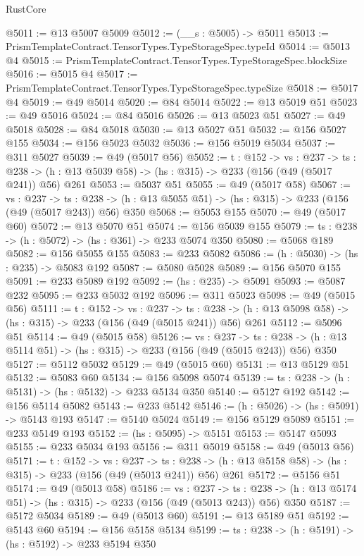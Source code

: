 \begin{lexlean}{RustCore}
\begin{coremodule}
@5011 := @13 @5007 @5009
@5012 := (__s : @5005) -> @5011
@5013 := PrismTemplateContract.TensorTypes.TypeStorageSpec.typeId
@5014 := @5013 @4
@5015 := PrismTemplateContract.TensorTypes.TypeStorageSpec.blockSize
@5016 := @5015 @4
@5017 := PrismTemplateContract.TensorTypes.TypeStorageSpec.typeSize
@5018 := @5017 @4
@5019 := @49 @5014
@5020 := @84 @5014
@5022 := @13 @5019 @51
@5023 := @49 @5016
@5024 := @84 @5016
@5026 := @13 @5023 @51
@5027 := @49 @5018
@5028 := @84 @5018
@5030 := @13 @5027 @51
@5032 := @156 @5027 @155
@5034 := @156 @5023 @5032
@5036 := @156 @5019 @5034
@5037 := @311 @5027
@5039 := @49 (@5017 @56)
@5052 := {t : @152} ->
  {vs : @237} ->
  {ts : @238} -> (h : @13 @5039 @58) -> (hs : @315) -> @233 (@156 (@49 (@5017 @241)) @56) @261
@5053 := @5037 @51
@5055 := @49 (@5017 @58)
@5067 := {vs : @237} ->
  {ts : @238} -> (h : @13 @5055 @51) -> (hs : @315) -> @233 (@156 (@49 (@5017 @243)) @56) @350
@5068 := @5053 @155
@5070 := @49 (@5017 @60)
@5072 := @13 @5070 @51
@5074 := @156 @5039 @155
@5079 := {ts : @238} -> (h : @5072) -> (hs : @361) -> @233 @5074 @350
@5080 := @5068 @189
@5082 := @156 @5055 @155
@5083 := @233 @5082
@5086 := (h : @5030) -> (hs : @235) -> @5083 @192
@5087 := @5080 @5028
@5089 := @156 @5070 @155
@5091 := @233 @5089 @192
@5092 := (hs : @235) -> @5091
@5093 := @5087 @232
@5095 := @233 @5032 @192
@5096 := @311 @5023
@5098 := @49 (@5015 @56)
@5111 := {t : @152} ->
  {vs : @237} ->
  {ts : @238} -> (h : @13 @5098 @58) -> (hs : @315) -> @233 (@156 (@49 (@5015 @241)) @56) @261
@5112 := @5096 @51
@5114 := @49 (@5015 @58)
@5126 := {vs : @237} ->
  {ts : @238} -> (h : @13 @5114 @51) -> (hs : @315) -> @233 (@156 (@49 (@5015 @243)) @56) @350
@5127 := @5112 @5032
@5129 := @49 (@5015 @60)
@5131 := @13 @5129 @51
@5132 := @5083 @60
@5134 := @156 @5098 @5074
@5139 := {ts : @238} -> (h : @5131) -> (hs : @5132) -> @233 @5134 @350
@5140 := @5127 @192
@5142 := @156 @5114 @5082
@5143 := @233 @5142
@5146 := (h : @5026) -> (hs : @5091) -> @5143 @193
@5147 := @5140 @5024
@5149 := @156 @5129 @5089
@5151 := @233 @5149 @193
@5152 := (hs : @5095) -> @5151
@5153 := @5147 @5093
@5155 := @233 @5034 @193
@5156 := @311 @5019
@5158 := @49 (@5013 @56)
@5171 := {t : @152} ->
  {vs : @237} ->
  {ts : @238} -> (h : @13 @5158 @58) -> (hs : @315) -> @233 (@156 (@49 (@5013 @241)) @56) @261
@5172 := @5156 @51
@5174 := @49 (@5013 @58)
@5186 := {vs : @237} ->
  {ts : @238} -> (h : @13 @5174 @51) -> (hs : @315) -> @233 (@156 (@49 (@5013 @243)) @56) @350
@5187 := @5172 @5034
@5189 := @49 (@5013 @60)
@5191 := @13 @5189 @51
@5192 := @5143 @60
@5194 := @156 @5158 @5134
@5199 := {ts : @238} -> (h : @5191) -> (hs : @5192) -> @233 @5194 @350

\end{coremodule}
\end{lexlean}
